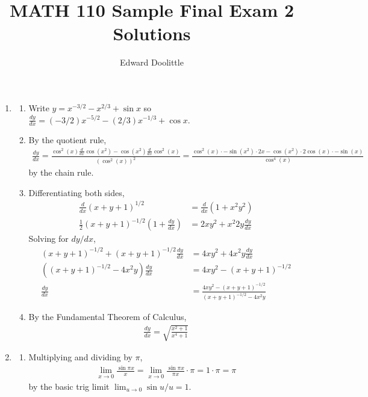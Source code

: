 \documentclass{article}
\title{MATH 110 Sample Final Exam 2 Solutions}
\author{Edward Doolittle}
\newcommand{\ds}{\displaystyle}
\begin{document}
\maketitle

\begin{enumerate}
\item 
  \begin{enumerate}
  \item Write $y=x^{-3/2}-x^{2/3}+\sin x$ so
    $\ds \frac{dy}{dx} = (-3/2)x^{-5/2}-(2/3)x^{-1/3}+\cos x$.
  \item By the quotient rule,
    \begin{align*}
      \frac{dy}{dx} = \frac{\cos^2(x)\frac{d}{dx}\cos(x^2)
        - \cos(x^2)\frac{d}{dx}\cos^2(x)}{(\cos^2(x))^2}
      = \frac{\cos^2(x)\cdot -\sin(x^2)\cdot 2x
        - \cos(x^2) \cdot 2\cos(x) \cdot -\sin(x)}{\cos^4(x)}
    \end{align*}
    by the chain rule.
  \item Differentiating both sides,
    \begin{align*}
      \frac{d}{dx} (x+y+1)^{1/2} &= \frac{d}{dx} (1+x^2y^2)
      \\
      \frac{1}{2} (x+y+1)^{-1/2} \left(1 + \frac{dy}{dx}\right)
      &= 2xy^2 + x^2 2y\frac{dy}{dx}
    \end{align*}
    Solving for $dy/dx$,
    \begin{align*}
      (x+y+1)^{-1/2} + (x+y+1)^{-1/2} \frac{dy}{dx}
      &= 4xy^2 + 4x^2y \frac{dy}{dx}
      \\
      \left((x+y+1)^{-1/2} - 4x^2y\right) \frac{dy}{dx}
      &= 4xy^2 - (x+y+1)^{-1/2}
      \\
      \frac{dy}{dx}
      &= \frac{4xy^2-(x+y+1)^{-1/2}}{(x+y+1)^{-1/2}-4x^2y}
    \end{align*}
  \item By the Fundamental Theorem of Calculus,
    \begin{align*}
      \frac{dy}{dx} = \sqrt{\frac{x^2+1}{x^4+1}}
    \end{align*}
  \end{enumerate}
\item
  \begin{enumerate}
  \item Multiplying and dividing by $\pi$,
    \begin{align*}
      \lim_{x\to 0} \frac{\sin \pi x}{x}
      = \lim_{x\to 0} \frac{\sin \pi x}{\pi x} \cdot \pi
      = 1 \cdot \pi = \pi
    \end{align*}
    by the basic trig limit $\lim_{u\to 0} \sin u/u = 1$.

\end{enumerate}
\end{enumerate}
\end{document}
